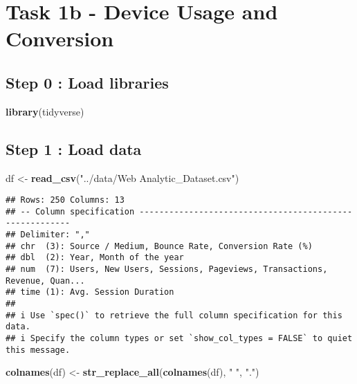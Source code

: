 \documentclass[
]{article}
\newenvironment{Shaded}{\begin{snugshade}}{\end{snugshade}}
\newcommand{\FunctionTok}[1]{\textcolor[rgb]{0.13,0.29,0.53}{\textbf{#1}}}
\newcommand{\NormalTok}[1]{#1}
\newcommand{\OtherTok}[1]{\textcolor[rgb]{0.56,0.35,0.01}{#1}}
\newcommand{\StringTok}[1]{\textcolor[rgb]{0.31,0.60,0.02}{#1}}
\begin{document}
\section{Task 1b - Device Usage and
Conversion}\label{task-1b---device-usage-and-conversion}

\subsection{Step 0 : Load libraries}\label{step-0-load-libraries}

\begin{Shaded}
\begin{Highlighting}[]
\FunctionTok{library}\NormalTok{(tidyverse)}
\end{Highlighting}
\end{Shaded}

\subsection{Step 1 : Load data}\label{step-1-load-data-1}

\begin{Shaded}
\begin{Highlighting}[]
\NormalTok{df }\OtherTok{\textless{}{-}} \FunctionTok{read\_csv}\NormalTok{(}\StringTok{"../data/Web Analytic\_Dataset.csv"}\NormalTok{)}
\end{Highlighting}
\end{Shaded}

\begin{verbatim}
## Rows: 250 Columns: 13
## -- Column specification --------------------------------------------------------
## Delimiter: ","
## chr  (3): Source / Medium, Bounce Rate, Conversion Rate (%)
## dbl  (2): Year, Month of the year
## num  (7): Users, New Users, Sessions, Pageviews, Transactions, Revenue, Quan...
## time (1): Avg. Session Duration
## 
## i Use `spec()` to retrieve the full column specification for this data.
## i Specify the column types or set `show_col_types = FALSE` to quiet this message.
\end{verbatim}

\begin{Shaded}
\begin{Highlighting}[]
\FunctionTok{colnames}\NormalTok{(df) }\OtherTok{\textless{}{-}} \FunctionTok{str\_replace\_all}\NormalTok{(}\FunctionTok{colnames}\NormalTok{(df), }\StringTok{" "}\NormalTok{, }\StringTok{"."}\NormalTok{)}
\end{Highlighting}
\end{Shaded}
\end{document}

